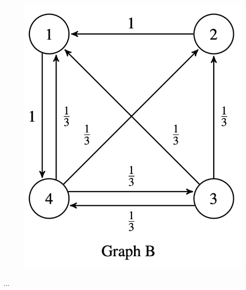 \documentclass[11pt]{article}
\begin{document}
\begin{enumerate}
\begin{enumerate}
	      	      			
	      \begin{figure}[h]
	      	\centering
	      	\includegraphics[scale=0.2]{q9b}
	      \end{figure}
	      \begin{Answer}
	      	...
	      \end{Answer}
	      	      			      	      			          

\end{enumerate}
\end{enumerate}
\end{document}
